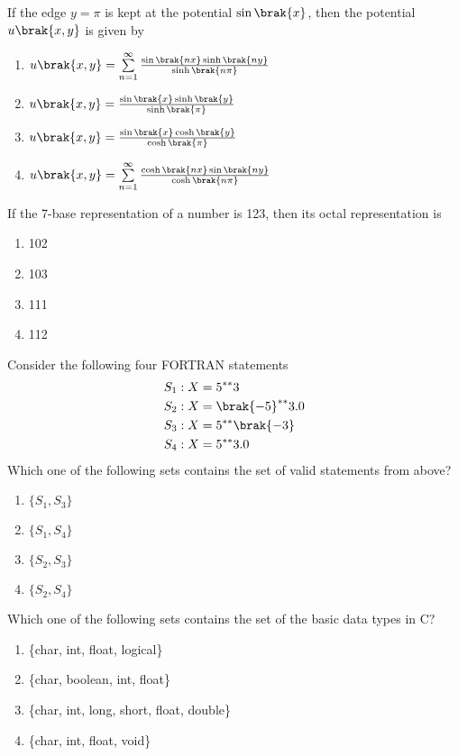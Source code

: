 \item If the edge $y = \pi$ is kept at the potential $\sin\brak{x}$, then the potential $u\brak{x, y}$ is given by
\begin{enumerate}
    \item $u\brak{x, y} = \sum\limits_{n=1}^{\infty}\frac{\sin\brak{nx}\sinh\brak{ny}}{\sinh\brak{n\pi}}$
    \item $u\brak{x, y} = \frac{\sin\brak{x}\sinh\brak{y}}{\sinh\brak{\pi}}$
    \item $u\brak{x, y} = \frac{\sin\brak{x}\cosh\brak{y}}{\cosh\brak{\pi}}$
    \item $u\brak{x, y} = \sum\limits_{n=1}^{\infty}\frac{\cosh\brak{nx}\sin\brak{ny}}{\cosh\brak{n\pi}}$ \\
\end{enumerate}
\item If the 7-base representation of a number is 123, then its octal representation is
\begin{enumerate}
    \item 102
    \item 103
    \item 111
    \item 112 \\
\end{enumerate}
\item Consider the following four FORTRAN statements
\begin{align*}
    S_1: X & = 5^{**}3 \\
    S_2: X & = \brak{-5}^{**}3.0 \\
    S_3: X & = 5^{**}\brak{-3} \\
    S_4: X & = 5^{**}3.0
\end{align*}
Which one of the following sets contains the set of valid statements from above?
\begin{enumerate}
    \item $\{S_1, S_3\}$
    \item $\{S_1, S_4\}$
    \item $\{S_2, S_3\}$
    \item $\{S_2, S_4\}$ \\
\end{enumerate}
\item Which one of the following sets contains the set of the basic data types in C?
\begin{enumerate}
   \item \{char, int, float, logical\}
   \item \{char, boolean, int, float\}
   \item \{char, int, long, short, float, double\}
   \item \{char, int, float, void\} \\
\end{enumerate}
